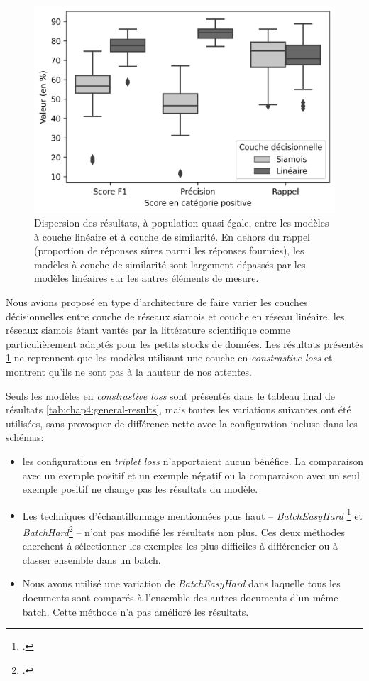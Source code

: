 \begin{figure}[p]
    \centering
    \includegraphics{figures/chap4/SiameseVsLinear.png}
    \caption{Dispersion des résultats, à population quasi égale, entre les modèles à couche linéaire et à couche de similarité. En dehors du rappel (proportion de réponses sûres parmi les réponses fournies), les modèles à couche de similarité sont largement dépassés par les modèles linéaires sur les autres éléments de mesure.}
    \label{fig:chap4:modeles-siamois-vs-lineaires}
\end{figure}

Nous avions proposé en type d'architecture de faire varier les couches décisionnelles entre couche de réseaux siamois et couche en réseau linéaire, les réseaux siamois étant vantés par la littérature scientifique comme particulièrement adaptés pour les petits stocks de données. Les résultats présentés \ref{fig:chap4:modeles-siamois-vs-lineaires} ne reprennent que les modèles utilisant une couche en \textit{constrastive loss} et montrent qu'ils ne sont pas à la hauteur de nos attentes.

Seuls les modèles en \textit{constrastive loss} sont présentés dans le tableau final de résultats \ref{tab:chap4:general-results}, mais toutes les variations suivantes ont été utilisées, sans provoquer de différence nette avec la configuration incluse dans les schémas:
\begin{itemize}
    \item les configurations en \textit{triplet loss} n'apportaient aucun bénéfice. La comparaison avec un exemple positif et un exemple négatif ou la comparaison avec un seul exemple positif ne change pas les résultats du modèle.
    \item Les techniques d'échantillonnage mentionnées plus haut -- \textit{BatchEasyHard} \footcite{xuan_improved_2020} et \textit{BatchHard}\footcite{hermans_defense_2017} -- n'ont pas modifié les résultats non plus. Ces deux méthodes cherchent à sélectionner les exemples les plus difficiles à différencier ou à classer ensemble dans un batch.
    \item Nous avons utilisé une  variation de \textit{BatchEasyHard} dans laquelle tous les documents sont comparés à l'ensemble des autres documents d'un même batch. Cette méthode n'a pas amélioré les résultats.
\end{itemize}

